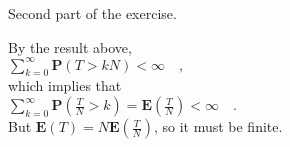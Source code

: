 \documentclass[11pt]{article} %
\begin{document}
Second part of the exercise.

By the result above,\\

$\displaystyle\sum_{k=0}^{\infty}\mathrm{\textbf{P}}\left(T>kN\right) < \infty \quad,$\\

which implies that\\

$\displaystyle\sum_{k=0}^{\infty}\mathrm{\textbf{P}}\left(\frac{T}{N}>k\right)=\mathrm{\textbf{E}}\left(\frac{T}{N}\right) < \infty \quad.$\\

But $\mathrm{\textbf{E}}\left(T\right)=N\mathrm{\textbf{E}}\left(\frac{T}{N}\right)$, so it must be finite.





\clearpage
\end{document}
